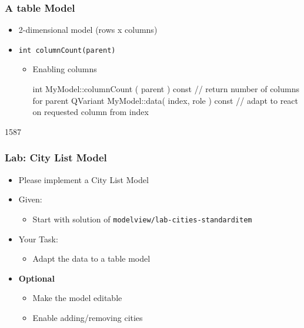 \begin{slide}[fragile]{}\frametitle{A table Model}
\begin{itemize}
  \item 2-dimensional model (rows x columns)
  \item \texttt{int columnCount(parent)}
  \begin{itemize}
    \item Enabling columns
    \begin{cpp}
int MyModel::columnCount ( parent ) const {
    // return number of columns for parent
}
QVariant MyModel::data( index, role ) const {
    // adapt to react on requested column from index
}    
    \end{cpp}
  \end{itemize}
\end{itemize}
\end{slide}

\begin{slide}{1587}\frametitle{Lab: City List Model}
  \begin{itemize}
  \item Please implement a City List Model
  \item Given:
    \begin{itemize}
    \item Start with solution of \texttt{modelview/lab-cities-standarditem}
    \end{itemize}
  \item Your Task:
    \begin{itemize}
    \item Adapt the data to a table model
    \end{itemize}
  \item \textbf{Optional}
    \begin{itemize}
    \item Make the model editable
    \item Enable adding/removing cities
   \end{itemize}
 \end{itemize}
 
\end{slide}




